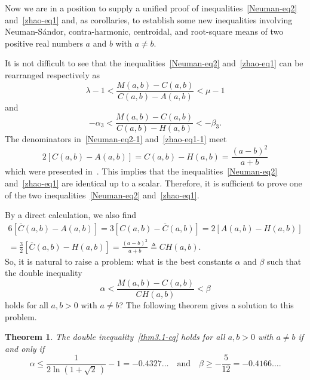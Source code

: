 \documentclass[reqno,a4paper]{amsart}
\numberwithin{equation}{section}
\theoremstyle{plain}
\newtheorem{thm}{Theorem}[section]
\theoremstyle{remark}
\begin{document}
Now we are in a position to supply a unified proof of inequalities~\eqref{Neuman-eq2} and~\eqref{zhao-eq1} and, as corollaries, to establish some new inequalities involving Neuman-S\'andor, contra-harmonic, centroidal, and root-square means of two positive real numbers $a$ and $b$ with $a\ne b$.
\par
It is not difficult to see that the inequalities~\eqref{Neuman-eq2} and~\eqref{zhao-eq1} can
be rearranged respectively as
\begin{equation}\label{Neuman-eq2-1}
\lambda-1<\frac{M(a,b)-C(a,b)}{C(a,b)-A(a,b)}<\mu-1
\end{equation}
and
\begin{equation}\label{zhao-eq1-1}
-\alpha_3<\frac{M(a,b)-C(a,b)}{C(a,b)-H(a,b)}<-\beta_3.
\end{equation}
The denominators in~\eqref{Neuman-eq2-1} and~\eqref{zhao-eq1-1} meet
\begin{equation}\label{lines-CH}
2[C(a,b)-A(a,b)]=C(a,b)-H(a,b)=\frac{(a-b)^2}{a+b}
\end{equation}
which were presented in~\cite[Eq.~(4.4)]{Jiang-serffert}.
This implies that the inequalities~\eqref{Neuman-eq2} and~\eqref{zhao-eq1} are identical up to a
scalar. Therefore, it is sufficient to prove one of the two inequalities~\eqref{Neuman-eq2}
and~\eqref{zhao-eq1}.
\par
By a direct calculation, we also find
\begin{multline}\label{line-equation}
6[\overline{C}(a,b)-A(a,b)]=3[C(a,b)-\overline{C}(a,b)] =2[A(a,b)-H(a,b)]\\
=\frac32[\overline{C}(a,b)-H(a,b)]=\frac{(a-b)^2}{a+b}\triangleq CH(a,b).
\end{multline}
So, it is natural to raise a problem: what is the best constants $\alpha$ and $\beta$ such that the double inequality
\begin{equation}\label{thm3.1-eq}
\alpha<\frac{M(a,b)-C(a,b)}{CH(a,b)}<\beta
\end{equation}
holds for all $a,b>0$ with $a\ne b$? The following theorem gives a solution to this problem.

\begin{thm}\label{thm3.1}
The double inequality~\eqref{thm3.1-eq} holds for all $a,b>0$ with $a\ne b$ if and only if
\begin{equation*}
\alpha\le\frac1{2\ln(1+\sqrt2\,)}-1=-0.4327\dotsc\quad\text{and}\quad\beta\ge-\frac5{12}=-0.4166\dotsc.
\end{equation*}
\end{thm}
\end{document}
